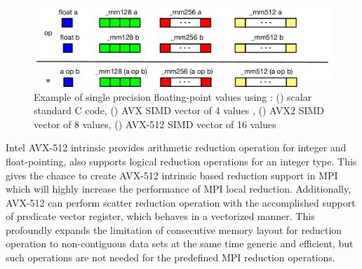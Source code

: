 \documentclass[sigconf]{acmart}
\newcommand{\mpi}[0]{\textsc{MPI}\xspace}
\begin{document}
\begin{figure}[h]
    \centering
    \includegraphics[width=\linewidth]{sse_avx.pdf}
    \caption{Example of single precision floating-point values using : (\colorbox{blue}{}) scalar standard C code, (\colorbox{green}{}) AVX SIMD vector of 4 values , (\colorbox{red}{}) AVX2 SIMD vector of 8 values, (\colorbox{yellow}{}) AVX-512 SIMD vector of 16 values}
    \label{fig:sse_avx}
\end{figure}

Intel AVX-512 intrinsic provides arithmetic reduction operation for integer and
float-pointing, also supports logical reduction operations for an integer type.
This gives the chance to create AVX-512 intrinsic based reduction support in \mpi which
will highly increase the performance of \mpi local reduction.
Additionally, AVX-512 can perform scatter reduction operation with the accomplished
support of predicate vector register, which behaves in a vectorized manner. This profoundly
expands the limitation of consecutive memory layout for reduction operation to non-contiguous
data sets at the same time generic and efficient, but such operations
are not needed for the predefined MPI reduction operations.
\end{document}
